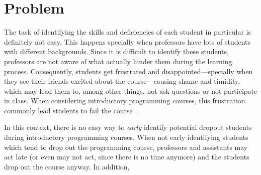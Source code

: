 \section{Problem}

\label{sec:problem}

The task of identifying the skills and deficiencies of each student in particular is definitely not easy. This happens specially when professors have lots of students with different backgrounds.
Since it is difficult to identify these students, professors are not aware of what actually hinder them during the learning process. Consequently, students get frustrated and disappointed---specially when they see their friends excited about the course---causing shame and timidity, which may lead them to, among other things, not ask questions or not participate in class. When considering introductory programming courses, this frustration commonly lead students to fail the course~\cite{}.


In this context, there is no easy way to \textit{early} identify potential dropout students during introductory programming courses. When not early identifying students which tend to drop out the programming course, professors and assistants may act late (or even may not act, since there is no time anymore) and the students drop out the course anyway. In addition, 

